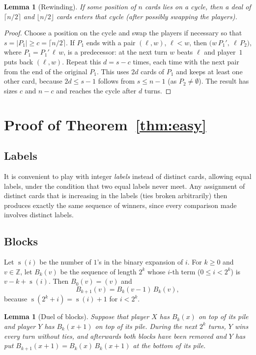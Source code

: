\documentclass[11pt,a4paper]{amsart}
\newtheorem{lemma}[theorem]{Lemma}
\theoremstyle{definition}
\theoremstyle{remark}
\newcommand{\pc}{\operatorname{s}}
\begin{document}
\begin{lemma}[Rewinding]\label{lem:rewind}
If some position of $n$ cards lies on a cycle, then a deal of $\lceil n/2\rceil$ and $\lfloor n/2\rfloor$ cards enters that cycle (after possibly swapping the players).
\end{lemma}

\begin{proof}
Choose a position on the cycle and swap the players if necessary so that $s=|P_1|\ge c=\lceil n/2\rceil$. If $P_1$ ends with a pair $(\ell,w)$, $\ell<w$, then $\bigl(w\,P_1',\ \ell\,P_2\bigr)$, where $P_1=P_1'\,\ell\,w$, is a predecessor: at the next turn $w$ beats $\ell$ and player~$1$ puts back $(\ell,w)$. Repeat this $d=s-c$ times, each time with the next pair from the end of the original $P_1$. This uses $2d$ cards of $P_1$ and keeps at least one other card, because $2d\le s-1$ follows from $s\le n-1$ (as $P_2\ne\emptyset$). The result has sizes $c$ and $n-c$ and reaches the cycle after $d$ turns.
\end{proof}

\section{Proof of Theorem~\ref{thm:easy}}\label{sec:easy}

\subsection{Labels} It is convenient to play with integer \emph{labels} instead of distinct cards, allowing equal labels, under the condition that two equal labels never meet. Any assignment of distinct cards that is increasing in the labels (ties broken arbitrarily) then produces exactly the same sequence of winners, since every comparison made involves distinct labels.

\subsection{Blocks} Let $\pc(i)$ be the number of $1$'s in the binary expansion of $i$. For $k\ge0$ and $v\in\mathbb Z$, let $B_k(v)$ be the sequence of length $2^k$ whose $i$-th term ($0\le i<2^k$) is $v-k+\pc(i)$. Then $B_0(v)=(v)$ and
\begin{equation}\label{eq:blocks}
B_{k+1}(v)=B_k(v-1)\,B_k(v),
\end{equation}
because $\pc(2^k+i)=\pc(i)+1$ for $i<2^k$.

\begin{lemma}[Duel of blocks]\label{lem:duel}
Suppose that player $X$ has $B_k(x)$ on top of its pile and player $Y$ has $B_k(x+1)$ on top of its pile. During the next $2^k$ turns, $Y$ wins every turn without ties, and afterwards both blocks have been removed and $Y$ has put $B_{k+1}(x+1)=B_k(x)\,B_k(x+1)$ at the bottom of its pile.
\end{lemma}
\end{document}

